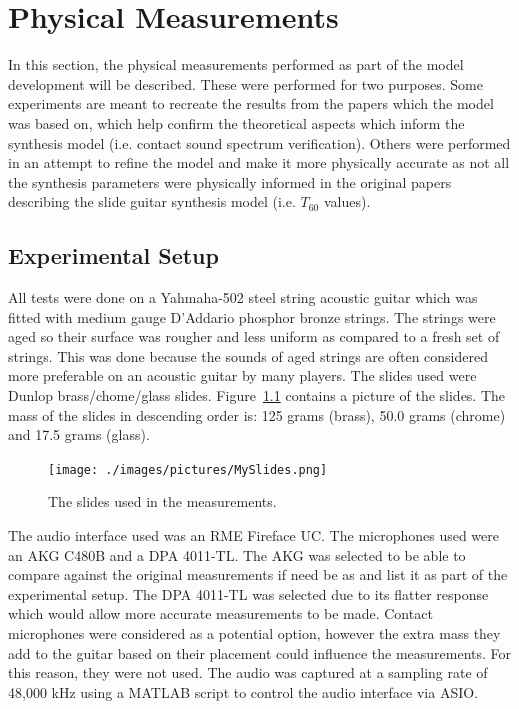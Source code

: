 \documentclass[../main.tex]{subfiles}
\begin{document}
\chapter{Physical Measurements}
In this section, the physical measurements performed as part of the model development will be described. These were performed for two purposes. Some experiments are meant to recreate the results from the papers which the model was based on, which help confirm the theoretical aspects which inform the synthesis model (i.e. contact sound spectrum verification). Others were performed in an attempt to refine the model and make it more physically accurate as not all the synthesis parameters were physically informed in the original papers describing the slide guitar synthesis model (i.e. $T_{60}$ values).

\section{Experimental Setup}
All tests were done on a Yahmaha-502 steel string acoustic guitar which was fitted with medium gauge D'Addario phosphor bronze strings. The strings were aged so their surface was rougher and less uniform as compared to a fresh set of strings. This was done because the sounds of aged strings are often considered more preferable on an acoustic guitar by many players. The slides used were Dunlop brass/chome/glass slides. Figure~\ref{fig:MySlides} contains a picture of the slides. The mass of the slides in descending order is: 125 grams (brass), 50.0 grams (chrome) and 17.5 grams (glass). 

\begin{figure}[h]
    \centering
    \texttt{[image: ./images/pictures/MySlides.png]}
    \caption{The slides used in the measurements.}
    \label{fig:MySlides}
\end{figure}

The audio interface used was an RME Fireface UC. The microphones used were an AKG C480B and a DPA 4011-TL. The AKG was selected to be able to compare against the original measurements if need be as  and  list it as part of the experimental setup. The DPA 4011-TL was selected due to its flatter response which would allow more accurate measurements to be made. Contact microphones were considered as a potential option, however the extra mass they add to the guitar based on their placement could influence the measurements. For this reason, they were not used. The audio was captured at a sampling rate of 48,000 kHz using a MATLAB script to control the audio interface via ASIO.
\end{document}
